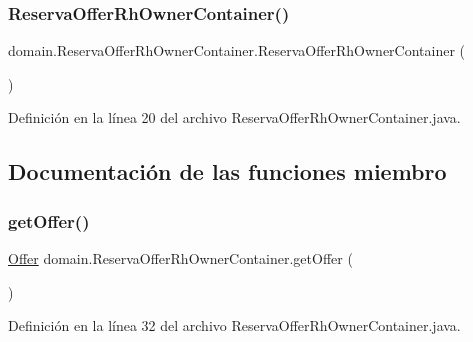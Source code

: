 \subsubsection{\texorpdfstring{ReservaOfferRhOwnerContainer()}{ReservaOfferRhOwnerContainer()}\hspace{0.1cm}{\footnotesize\ttfamily [2/2]}}
{\footnotesize\ttfamily domain.\+Reserva\+Offer\+Rh\+Owner\+Container.\+Reserva\+Offer\+Rh\+Owner\+Container (\begin{DoxyParamCaption}{ }\end{DoxyParamCaption})}



Definición en la línea 20 del archivo Reserva\+Offer\+Rh\+Owner\+Container.\+java.


\begin{DoxyCode}{0}

\end{DoxyCode}


\subsection{Documentación de las funciones miembro}
\mbox{\label{classdomain_1_1_reserva_offer_rh_owner_container_af4089b377fb75d45f5178ddcb13d244d}} 
\subsubsection{\texorpdfstring{getOffer()}{getOffer()}}
{\footnotesize\ttfamily \mbox{\hyperlink{classdomain_1_1_offer}{Offer}} domain.\+Reserva\+Offer\+Rh\+Owner\+Container.\+get\+Offer (\begin{DoxyParamCaption}{ }\end{DoxyParamCaption})}



Definición en la línea 32 del archivo Reserva\+Offer\+Rh\+Owner\+Container.\+java.


\begin{DoxyCode}{0}

\end{DoxyCode}


